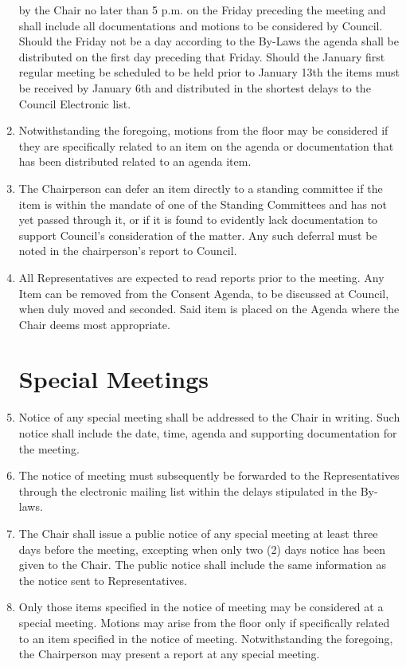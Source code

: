\documentclass[oneside]{book}
\begin{document}
\begin{enumerate}
by the Chair no later than 5 p.m. on the Friday preceding the meeting and shall include
all documentations and motions to be considered by Council. Should the Friday not be a day 
according to the By-Laws the agenda shall be distributed on the first day preceding that Friday. 
Should the January first regular meeting be scheduled to be held prior to January 13th
the items must be received by January 6th and distributed in the shortest delays to the 
Council Electronic list. 
\item Notwithstanding the foregoing, motions from the floor may be considered if they are
specifically related to an item on the agenda or documentation that
has been distributed related to an agenda item.
\item The Chairperson can defer an item directly to a standing committee
if the item is within the mandate of one of the Standing Committees and has not yet passed 
through it, or if it is found to evidently lack documentation to support Council’s 
consideration of the matter. Any such deferral must be noted in the chairperson's report to Council. 
\item \label{remove-from-consent} All Representatives are expected to read reports prior to the meeting.
Any Item can be removed from the Consent Agenda, to be discussed at Council, 
when duly moved and seconded. Said item is placed on the Agenda where the Chair 
deems most appropriate. 

\section{\label{Special_Meetings}Special Meetings }
\item Notice of any special meeting shall be addressed to the Chair in writing.
Such notice shall include the date, time, agenda and supporting documentation for the meeting. 
\item The notice of meeting must subsequently be forwarded to the Representatives through the 
electronic mailing list within the delays stipulated in the By-laws. 
\item The Chair shall issue a public notice of any special meeting at
least three days before the meeting, excepting when only two (2) days notice has been given to the Chair. 
The public notice shall include the same information as the notice sent to Representatives. 
\item Only those items specified in the notice of meeting may be considered
at a special meeting. Motions may arise from the floor only if specifically
related to an item specified in the notice of meeting. Notwithstanding
the foregoing, the Chairperson may present a report at any special
meeting. 


\end{enumerate}
\end{document}

